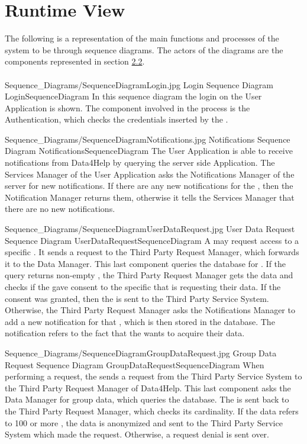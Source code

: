 \documentclass[../../DD.tex]{subfiles}
\begin{document}
\section{Runtime View\label{sect:2.4}}
\indent The following is a representation of the main functions and processes of the system to be through sequence diagrams. The actors of the diagrams are the components represented in section \hyperref[sect:2.2]{2.2}.\\ \\

	\image {13cm} {Sequence_Diagrams/SequenceDiagramLogin.jpg} {Login Sequence Diagram} {LoginSequenceDiagram}
	In this sequence diagram the  login on the User Application is shown. The component involved in the process is the Authentication, which checks the credentials inserted by the .

	\image {13cm} {Sequence_Diagrams/SequenceDiagramNotifications.jpg} {Notifications Sequence Diagram} {NotificationsSequenceDiagram}
	The User Application is able to receive notifications from Data4Help by querying the server side Application. The Services Manager of the User Application asks the Notifications Manager of the server for new notifications. If there are any new notifications for the , then the Notification Manager returns them, otherwise it tells the Services Manager that there are no new notifications.

	\image {13cm} {Sequence_Diagrams/SequenceDiagramUserDataRequest.jpg} {User Data Request Sequence Diagram} {UserDataRequestSequenceDiagram}
	A  may request access to a specific . It sends a request to the Third Party Request Manager, which forwards it to the Data Manager. This last component queries the database for . If the query returns non-empty , the Third Party Request Manager gets the data and checks if the  gave consent to the specific  that is requesting their data. If the consent was granted, then the  is sent to the Third Party Service System. Otherwise, the Third Party Request Manager asks the Notifications Manager to add a new notification for that , which is then stored in the database. The notification refers to the fact that the  wants to acquire their data.

	\image {13cm} {Sequence_Diagrams/SequenceDiagramGroupDataRequest.jpg} {Group Data Request Sequence Diagram} {GroupDataRequestSequenceDiagram}
	When performing a  request, the  sends a request from the Third Party Service System to the Third Party Request Manager of Data4Help. This last component asks the Data Manager for group data, which queries the database. The  is sent back to the Third Party Request Manager, which checks its cardinality. If the data refers to 100 or more , the data is anonymized and sent to the Third Party Service System which made the request. Otherwise, a request denial is sent over.
	
\end{document}
